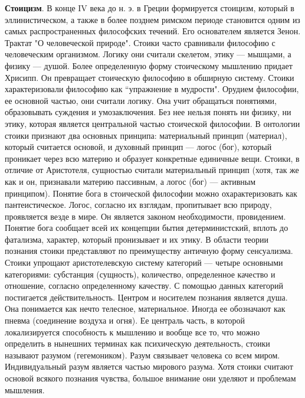 \documentclass[12pt]{article}
\begin{document}
\textbf{Стоицизм}. В конце IV века до н. э. в Греции формируется стоицизм, который в эллинистическом, а также в более
позднем римском периоде становится одним из самых распространенных философских течений.
Его основателем является Зенон.
Трактат  "О  человеческой  природе".  Стоики  часто  сравнивали  философию  с  человеческим организмом.  Логику  они  считали
скелетом, этику --- мышцами, а физику --- душой. Более определенную форму стоическому мышлению придает
Хрисипп. Он  превращает стоическую  философию  в  обширную  систему. 
Стоики  характеризовали философию  как ``упражнение  в
мудрости". Орудием философии, ее основной частью, они считали логику. Она учит обращаться понятиями,
образовывать  суждения  и  умозаключения.  Без  нее  нельзя  понять  ни  физику,  ни  этику,  которая  является
центральной частью стоической философии. В онтологии стоики признают два основных принципа:
материальный принцип
(материал), который считается основой, и духовный принцип --- логос (бог),
который проникает через всю материю
и образует конкретные единичные  вещи.  Стоики,  в отличие от Аристотеля, сущностью  считали материальный
принцип (хотя, так же как и он, признавали материю пассивным, а логос (бог) --- активным принципом).
Понятие
бога в стоической философии можно охарактеризовать как пантеистическое. Логос, согласно их взглядам, пропитывает всю
природу, проявляется везде в мире. Он является законом необходимости, провидением. Понятие бога сообщает всей
их концепции бытия детерминистский, вплоть до фатализма, характер, который пронизывает и их этику. В области
теории  познания  стоики  представляют  по  преимуществу  античную  форму  сенсуализма.  Стоики  упрощают
аристотелевскую  систему  категорий --- четыре  основными  категориями:  субстанция  (сущность),  количество,
определенное  качество  и  отношение,  согласно  определенному  качеству.  С  помощью  данных  категорий
постигается  действительность.  Центром  и  носителем  познания  является  душа.  Она  понимается  как  нечто  телесное,
материальное. Иногда ее обозначают как пневма (соединение воздуха и огня). Ее централь часть, в которой
локализируется способность к мышлению и вообще все то, что можно определить в нынешних терминах как
психическую деятельность, стоики называют разумом (гегемоником). Разум связывает человека со всем миром.
Индивидуальный разум является частью мирового разума. Хотя стоики считают основой всякого познания чувства,
большое внимание они уделяют и проблемам мышления. 

\newpage
\end{document}
